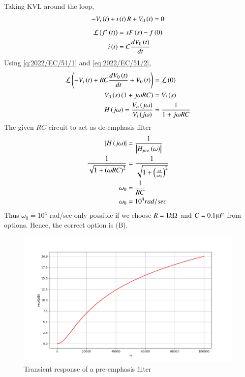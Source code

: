 \documentclass[journal,12pt,onecolumn]{IEEEtran}
\theoremstyle{remark}
\begin{document}
\\
    Taking KVL around the loop,
    \begin{align}
        -V_i\left(t\right) + i\left(t\right)R + V_0\left(t\right)=0 
    \end{align}
    \begin{align}
        \mathcal{L}\left(f'\left(t\right)\right) &= sF\left(s\right)-f\left(0\right) \label{q:2022/EC/51/1} \\
        i\left(t\right)&= C\frac{dV_0\left(t\right)}{dt} \label{eq:2022/EC/51/2}
    \end{align}
    Using \eqref{q:2022/EC/51/1} and \eqref{eq:2022/EC/51/2},
    \begin{align}
        \mathcal{L}\left( -V_i\left(t\right) + RC\frac{dV_0\left(t\right)}{dt} + V_0\left(t\right)\right)&=\mathcal{L}\left(0\right) \\
        V_0\left(s\right)\left(1+j\omega RC\right)&= V_i\left(s\right) \\
         H\left(j\omega\right)=\frac{V_o\left(j\omega\right)}{V_i\left(j\omega\right)} &= \frac{1}{1+j\omega RC}
    \end{align}
The given $RC$ circuit to act as de-emphasis filter
\begin{align}
    \left\vert H\left(j\omega\right)\right\vert&= \frac{1}{\left\vert H_{pre}\left(\omega\right)\right\vert} \\
    \frac{1}{\sqrt{1+\left(\omega RC\right)^2}}&= \frac{1}{\sqrt{1+\left(\frac{\omega}{\omega_0}\right)^2}} \\
    \omega_0&= \frac{1}{RC} \\
    \omega_0&=10^4 rad/sec
\end{align}
Thus $\omega_0=10^4$ rad/sec only possible if we choose $R=1k\ohm$ and $C=0.1\micro F$ from options. Hence, the correct option is (B).
\begin{figure}[ht]
        \centering
        \includegraphics[width=\columnwidth]{figs/plot.png}
        \caption{Transient response of a pre-emphasis filter}
    \end{figure}
\end{document}
